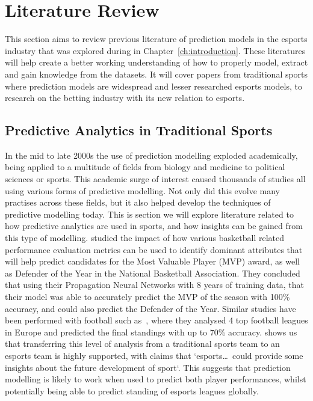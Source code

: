 \chapter{Literature Review}\label{ch:literaturereview}
This section aims to review previous literature of prediction models in the esports industry that was explored during in Chapter~\ref{ch:introduction}.
These literatures will help create a better working understanding of how to properly model, extract and gain knowledge from the datasets.
It will cover papers from traditional sports where prediction models are widespread and lesser researched esports models, to research on the betting industry with its new relation to esports.

\section{Predictive Analytics in Traditional Sports}\label{sec:TradSports}
In the mid to late 2000s the use of prediction modelling exploded academically, being applied to a multitude of fields from biology and medicine to political sciences or sports.
This academic surge of interest caused thousands of studies all using various forms of predictive modelling.
Not only did this evolve many practises across these fields, but it also helped develop the techniques of predictive modelling today.
This is section we will explore literature related to how predictive analytics are used in sports, and how insights can be gained from this type of modelling.
\citet{sarlis2020sports} studied the impact of how various basketball related performance evaluation metrics can be used to identify dominant attributes that will help predict candidates for the Most Valuable Player (MVP) award, as well as Defender of the Year in the National Basketball Association.
They concluded that using their Propagation Neural Networks with 8 years of training data, that their model was able to accurately predict the MVP of the season with 100\% accuracy, and could also predict the Defender of the Year.
Similar studies have been performed with football such as~\citet{pantzalis2020sports}, where they analysed 4 top football leagues in Europe and predicted the final standings with up to 70\% accuracy.
\citet{scelles2021peculiar} shows us that transferring this level of analysis from a traditional sports team to an esports team is highly supported, with claims that `esports\ldots~could provide some insights about the future development of sport`.
This suggests that prediction modelling is likely to work when used to predict both player performances, whilst potentially being able to predict standing of esports leagues globally. \\

